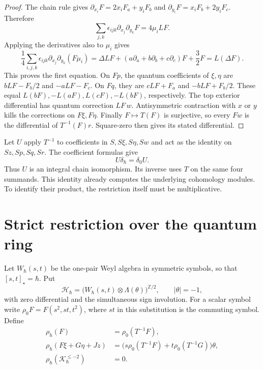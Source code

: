 \begin{proof}
The chain rule gives
$\partial_{x_i}F=2x_iF_a+y_iF_b$ and
$\partial_{y_i}F=x_iF_b+2y_iF_c$. Therefore
\[
 \sum_{j,k}\epsilon_{ijk}
       \partial_{x_j}\partial_{y_k}F=4\mu_i LF.
\]
Applying the derivatives also to $\mu_i$ gives
\[
 \frac14\sum_{i,j,k}\epsilon_{ijk}
    \partial_{x_j}\partial_{y_k}(F\mu_i)
  =\Delta LF+(a\partial_a+b\partial_b+c\partial_c)F
       +\frac32F
  =L(\Delta F).
\]
This proves the first equation.
On $Fp$, the quantum coefficients of $\xi,\eta$ are
$bLF-F_b/2$ and $-aLF-F_c$.
On $Fq$, they are $cLF+F_a$ and $-bLF+F_b/2$.
These equal $L(bF),-L(aF),L(cF),-L(bF)$, respectively.
The top exterior differential has quantum correction $LF\,w$.
Antisymmetric contraction with $x$ or $y$ kills the corrections
on $F\xi,F\eta$.
Finally $F\mapsto T(F)$ is surjective, so every $Fw$ is the
differential of $T^{-1}(F)r$. Square-zero then gives its stated
differential.
\end{proof}

Let $U$ apply $T^{-1}$ to coefficients in
$S,S\xi,S\eta,Sw$ and act as the identity on
$Sz,Sp,Sq,Sr$. The coefficient formulas give
\begin{equation}\label{eq:vol2-relative-linear-comparison}
 U\delta_\hbar=\delta_0U.
\end{equation}
Thus $U$ is an integral chain isomorphism. Its inverse uses $T$
on the same four summands. This identity already computes the
underlying cohomology modules. To identify their product, the
restriction itself must be multiplicative.

\section{Strict restriction over the quantum ring}
\label{sec:vol2-strict-relative-restriction}

Let $W_\hbar(s,t)$ be the one-pair Weyl algebra in symmetric
symbols, so that $[s,t]_\star=\hbar$. Put
\[
 \mathcal H_\hbar
   =\bigl(W_\hbar(s,t)\otimes\Lambda(\theta)\bigr)^{\mathbb Z/2},
 \qquad |\theta|=-1,
\]
with zero differential and the simultaneous sign involution.
For a scalar symbol write $\rho_0F=F(s^2,st,t^2)$, where
$st$ in this substitution is the commuting symbol.
Define
\begin{equation}\label{eq:vol2-quantum-rank-two-restriction}
 \begin{aligned}
 \rho_\hbar(F)&=\rho_0(T^{-1}F),\\
 \rho_\hbar(F\xi+G\eta+Jz)
   &=\bigl(s\rho_0(T^{-1}F)+t\rho_0(T^{-1}G)\bigr)\theta,\\
 \rho_\hbar(\mathcal K_\hbar^{\leq-2})&=0.
 \end{aligned}
\end{equation}

